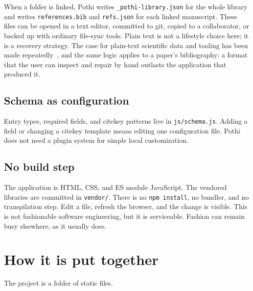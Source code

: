 \documentclass[10pt,twocolumn]{article}
\begin{document}
When a folder is linked, Pothi writes \verb|_pothi-library.json| for the whole library and writes \verb|references.bib| and \verb|refs.json| for each linked manuscript. These files can be opened in a text editor, committed to git, copied to a collaborator, or backed up with ordinary file-sync tools. Plain text is not a lifestyle choice here; it is a recovery strategy. The case for plain-text scientific data and tooling has been made repeatedly~\cite{Broman2018Spreadsheets,Wilson2017GoodEnough}, and the same logic applies to a paper's bibliography: a format that the user can inspect and repair by hand outlasts the application that produced it.

\subsection{Schema as configuration}

Entry types, required fields, and citekey patterns live in \texttt{js/schema.js}. Adding a field or changing a citekey template means editing one configuration file. Pothi does not need a plugin system for simple local customization.

\subsection{No build step}

The application is HTML, CSS, and ES module JavaScript. The vendored libraries are committed in \texttt{vendor/}. There is no \texttt{npm install}, no bundler, and no transpilation step. Edit a file, refresh the browser, and the change is visible. This is not fashionable software engineering, but it is serviceable. Fashion can remain busy elsewhere, as it usually does.

\section{How it is put together}

The project is a folder of static files.
\end{document}
